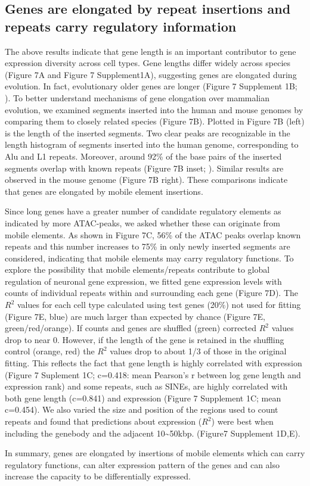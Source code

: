 \subsection{Genes are elongated by repeat insertions and repeats carry regulatory information}

The above results indicate that gene length is an important contributor to gene expression diversity across cell types. Gene lengths differ widely across species (Figure 7A and Figure 7 Supplement1A), suggesting genes are elongated during evolution. In fact, evolutionary older genes are longer (Figure 7 Supplement 1B; \cite{Grishkevich_2014}). To better understand mechanisms of gene elongation over mammalian evolution, we examined segments inserted into the human and mouse genomes by comparing them to closely related species (Figure 7B). Plotted in Figure 7B (left) is the length of the inserted segments. Two clear peaks are recognizable in the length histogram of segments inserted into the human genome, corresponding to Alu and L1 repeats. Moreover, around 92\% of the base pairs of the inserted segments overlap with known repeats (Figure 7B inset; \cite{Hubley_2015}). Similar results are observed in the mouse genome (Figure 7B right). These comparisons indicate that genes are elongated by mobile element insertions. 

Since long genes have a greater number of candidate regulatory elements as indicated by more ATAC-peaks, we asked whether these can originate from mobile elements. As shown in Figure 7C, 56\% of the ATAC peaks overlap known repeats and this number increases to 75\% in only newly inserted segments are considered, indicating that mobile elements may carry regulatory functions. To explore the possibility that mobile elements/repeats contribute to global regulation of  neuronal gene expression, we fitted gene expression levels with  counts of individual repeats within  and surrounding each gene (Figure 7D).  The $R^2$ values for each cell type calculated using test genes (20\%) not used for fitting (Figure 7E, blue) are much larger than expected by chance (Figure 7E, green/red/orange). If counts and genes are shuffled (green) corrected $R^2$ values drop to near 0. However, if the length of the gene is retained in the shuffling control (orange, red) the $R^2$ values drop to about 1/3 of those in the original fitting. This reflects the fact that gene length is highly correlated with expression (Figure 7 Suplement 1C; c=0.418: mean Pearson's r between log gene length and expression rank) and some repeats, such as SINEs, are highly correlated with both gene length (c=0.841) and expression (Figure 7 Supplement 1C; mean c=0.454). We also varied the size and position of the regions used to count repeats and found that predictions about expression ($R^2$) were best when including the genebody and the adjacent 10\sim 50kbp. (Figure7 Supplement 1D,E). 

In summary, genes are elongated by insertions of mobile elements which can carry regulatory functions, can alter expression pattern of the genes and can also increase the capacity to be differentially expressed. 


